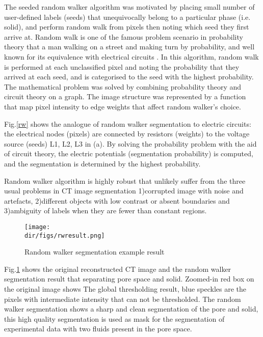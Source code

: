 The seeded random walker algorithm was motivated by placing small number of user-defined labels (seeds) that unequivocally belong to a particular phase (i.e. solid), and perform random walk from pixels then noting which seed they first arrive at. Random walk is one of the famous problem scenario in probability theory that a man walking on a street and making turn by probability, and well known for its equivalence with electrical circuits \citep{doyle1984random}. In this algorithm, random walk is performed at each unclassified pixel and noting the probability that they arrived at each seed, and is categorised to the seed with the highest probability. The mathematical problem was solved by combining probability theory and circuit theory on a graph. The image structure was represented by a function that map pixel intensity to edge weights that affect random walker's choice.  

Fig.\ref{rw} shows the analogue of random walker segmentation to electric circuits: the electrical nodes (pixels) are connected by resistors (weights) to the voltage source (seeds) L1, L2, L3 in (a). By solving the probability problem with the aid of circuit theory, the electric potentials (segmentation probability) is computed, and the segmentation is determined by the highest probability.

Random walker algorithm is highly robust that unlikely suffer from the three usual problems in CT image segmentation 1)corrupted image with noise and artefacts, 2)different objects with low contrast or absent boundaries and 3)ambiguity of labels when they are fewer than constant regions. 

\begin{figure}[htbp]
  \centering
  \texttt{[image: \\dir/figs/rwresult.png]}
  \caption{Random walker segmentation example result}
  \label{rwresult}
\end{figure}

Fig.\ref{rwresult} shows the original reconstructed CT image and the random walker segmentation result that separating pore space and solid. Zoomed-in red box on the original image shows The global thresholding result, blue speckles are the pixels with intermediate intensity that can not be thresholded. The random walker segmentation shows a sharp and clean segmentation of the pore and solid, this high quality segmentation is used as mask for the segmentation of experimental data with two fluids present in the pore space.

